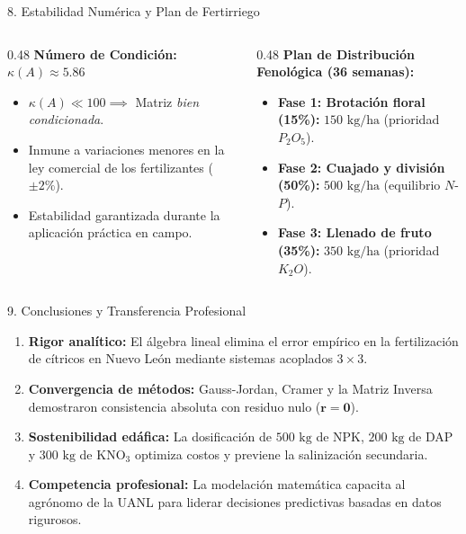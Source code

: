 \documentclass[
  spanish,
  aspectratio=169,
  xcolor={dvipsnames,table}
]{beamer}
\begin{document}
\begin{frame}{8. Estabilidad Numérica y Plan de Fertirriego}
  \begin{columns}[T]
    \begin{column}{0.48\textwidth}
      \textbf{\color{uanlblue}Número de Condición: $\kappa(A) \approx 5.86$}
      \begin{itemize}
        \item $\kappa(A) \ll 100 \implies$ Matriz \textit{bien condicionada}.
        \item Inmune a variaciones menores en la ley comercial de los fertilizantes ($\pm 2\%$).
        \item Estabilidad garantizada durante la aplicación práctica en campo.
      \end{itemize}
    \end{column}
    \begin{column}{0.48\textwidth}
      \textbf{\color{uanlblue}Plan de Distribución Fenológica (36 semanas):}
      \begin{itemize}
        \item \textbf{Fase 1: Brotación floral (15\%):} $150\text{ kg/ha}$ (prioridad $P_2O_5$).
        \item \textbf{Fase 2: Cuajado y división (50\%):} $500\text{ kg/ha}$ (equilibrio $N$-$P$).
        \item \textbf{Fase 3: Llenado de fruto (35\%):} $350\text{ kg/ha}$ (prioridad $K_2O$).
      \end{itemize}
    \end{column}
  \end{columns}
\end{frame}

\begin{frame}{9. Conclusiones y Transferencia Profesional}
  \begin{enumerate}
    \item \textbf{Rigor analítico:} El álgebra lineal elimina el error empírico en la fertilización de cítricos en Nuevo León mediante sistemas acoplados $3 \times 3$.
    \item \textbf{Convergencia de métodos:} Gauss-Jordan, Cramer y la Matriz Inversa demostraron consistencia absoluta con residuo nulo ($\mathbf{r} = \mathbf{0}$).
    \item \textbf{Sostenibilidad edáfica:} La dosificación de $500\text{ kg}$ de NPK, $200\text{ kg}$ de DAP y $300\text{ kg}$ de KNO$_3$ optimiza costos y previene la salinización secundaria.
    \item \textbf{Competencia profesional:} La modelación matemática capacita al agrónomo de la UANL para liderar decisiones predictivas basadas en datos rigurosos.
  \end{enumerate}
\end{frame}
\end{document}
